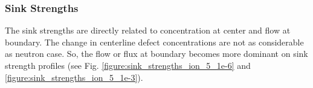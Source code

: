 \documentclass[a4paper]{article}
\begin{document}
    \newpage
    \subsubsection{Sink Strengths} \hspace{10pt}
    The sink strengths are directly related to concentration at center and flow at boundary. The change in centerline defect concentrations are not as considerable as neutron case. So, the flow or flux at boundary becomes more dominant on sink strength profiles (see Fig. \ref{figure:sink_strengths_ion_5_1e-6} and \ref{figure:sink_strengths_ion_5_1e-3}).
      \begin{figure}[h!]  %
        \centering
        \qquad

\end{figure}
\end{document}
